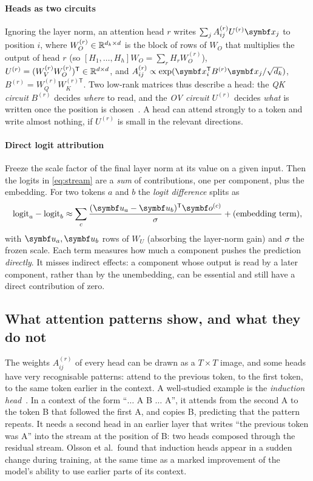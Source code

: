 \documentclass[11pt]{article}
\newcommand{\uv}{\vect{u}}
\begin{document}
\paragraph{Heads as two circuits} Ignoring the layer norm, an attention head $r$ writes $\sum_j A^{(r)}_{ij}U^{(r)}\x_j$ to
position $i$, where $W_O^{(r)} \in \mathbb{R}^{d_k \times d}$ is the block of rows of $W_O$ that multiplies the output of head $r$
(so $[H_1, \dots, H_h]W_O = \sum_r H_rW_O^{(r)}$), $U^{(r)} = (W_V^{(r)}W_O^{(r)})^{\mathsf{T}} \in \mathbb{R}^{d \times d}$, and
$A^{(r)}_{ij} \propto \exp(\x_i\T B^{(r)}\x_j/\sqrt{d_k})$, $B^{(r)} = W_Q^{(r)}W_K^{(r)\mathsf{T}}$. Two low-rank matrices thus
describe a head: the \emph{QK circuit} $B^{(r)}$ decides \emph{where} to read, and the \emph{OV circuit} $U^{(r)}$ decides
\emph{what} is written once the position is chosen~\cite{elhage2021}. A head can attend strongly to a token and write almost
nothing, if $U^{(r)}$ is small in the relevant directions.

\paragraph{Direct logit attribution} Freeze the scale factor of the final layer norm at its value on a given input. Then the
logits in \eqref{eq:stream} are a \emph{sum} of contributions, one per component, plus the embedding. For two tokens $a$ and $b$ the \emph{logit difference} splits as
\[
  \text{logit}_a - \text{logit}_b \approx \sum_c \frac{(\uv_a - \uv_b)\T\vect{o}^{(c)}}{\sigma} + (\text{embedding term}),
\]
with $\uv_a, \uv_b$ rows of $W_U$ (absorbing the layer-norm gain) and $\sigma$ the frozen scale. Each term measures how much
a component pushes the prediction \emph{directly}. It misses indirect effects: a component whose output is read by a later
component, rather than by the unembedding, can be essential and still have a direct contribution of zero.

\subsection{What attention patterns show, and what they do not}\label{sec:patterns}

The weights $A^{(r)}_{ij}$ of every head can be drawn as a $T \times T$ image, and some heads have very recognisable
patterns: attend to the previous token, to the first token, to the same token earlier in the context. A well-studied
example is the \emph{induction head}~\cite{elhage2021,olsson2022}. In a context of the form ``$\ldots$ A B $\ldots$ A'', it
attends from the second A to the token B that followed the first A, and copies B, predicting that the pattern repeats.
It needs a second head in an earlier layer that writes ``the previous token was A'' into the stream at the position of B:
two heads composed through the residual stream. Olsson et al.\ found that induction heads appear in a sudden change during
training, at the same time as a marked improvement of the model's ability to use earlier parts of its context.
\end{document}
